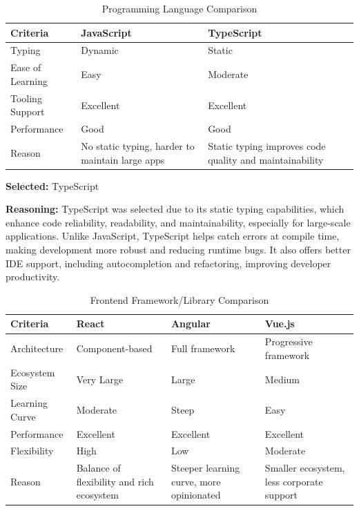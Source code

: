 \begin{table}[H]
\centering
\caption{Programming Language Comparison}
\begin{tabular}{|l|p{6cm}|p{6cm}|}
\hline
\textbf{Criteria}       & \textbf{JavaScript} & \textbf{TypeScript} \\
\hline
Typing                  & Dynamic             & Static             \\
Ease of Learning        & Easy                & Moderate           \\
Tooling Support        & Excellent           & Excellent          \\
Performance            & Good                & Good               \\
Reason                 & No static typing, harder to maintain large apps & Static typing improves code quality and maintainability \\
\hline
\end{tabular}
\label{tab:programming-language-comparison}
\end{table}

\textbf{Selected:} TypeScript \par
\textbf{Reasoning:} TypeScript was selected due to its static typing capabilities, which enhance code reliability, readability, and maintainability, especially for large-scale applications. Unlike JavaScript, TypeScript helps catch errors at compile time, making development more robust and reducing runtime bugs. It also offers better IDE support, including autocompletion and refactoring, improving developer productivity.

\vspace{2em}

\begin{table}[H]
\centering
\caption{Frontend Framework/Library Comparison}
\begin{tabular}{|l|p{4cm}|p{4cm}|p{4cm}|}
\hline
\textbf{Criteria}       & \textbf{React}                & \textbf{Angular}               & \textbf{Vue.js}               \\
\hline
Architecture            & Component-based               & Full framework                & Progressive framework         \\
Ecosystem Size          & Very Large                   & Large                        & Medium                       \\
Learning Curve          & Moderate                     & Steep                        & Easy                         \\
Performance             & Excellent                    & Excellent                    & Excellent                    \\
Flexibility             & High                         & Low                          & Moderate                     \\
Reason                  & Balance of flexibility and rich ecosystem & Steeper learning curve, more opinionated & Smaller ecosystem, less corporate support \\
\hline
\end{tabular}
\label{tab:frontend-framework-comparison}
\end{table}

